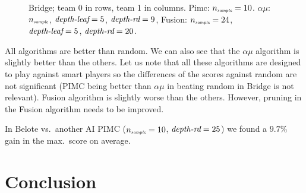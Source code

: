 \documentclass[runningheads]{llncs}
\begin{document}
\begin{figure}[t]
\label{fig:exp-br}
    \centering
\vspace{-0.7cm}      
    \caption{Bridge; team 0 in rows, team 1 in columns. Pimc: $n_{\mbox{\em \tiny sample}} = 10$. $\alpha\mu$: $n_{\mbox{\em \tiny sample}}$, $\mbox{\em depth-leaf} = 5$, $\mbox{\em depth-rd} = 9$, Fusion: $n_{\mbox{\em \tiny sample}} = 24$, $\mbox{\em depth-leaf} = 5$, $\mbox{\em depth-rd} = 20$.}
\end{figure}
% 
%
%
All algorithms are better than random. We can also see that the $\alpha\mu$ algorithm is slightly better than the others. Let us note that all these algorithms are designed to play against smart players so the differences of the scores against random are not significant (PIMC being better than $\alpha\mu$ in beating random in Bridge is not relevant). Fusion algorithm is slightly worse than the others. However, pruning in the Fusion algorithm needs to be improved. 

In Belote vs.\ another AI PIMC ($n_{\mbox{\em \tiny sample}}=10$, $\mbox{\em depth-rd} = 25$) we
found a $9.7\%$ gain in the max.\ score on average. 


\section{Conclusion}
\end{document}
